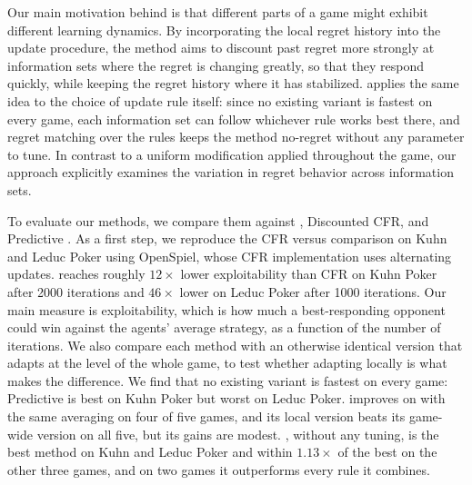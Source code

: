 Our main motivation behind \ours{} is that different parts of a game might exhibit different
learning dynamics. By incorporating the local regret history into the update procedure, the
method aims to discount past regret more strongly at information sets where the regret is
changing greatly, so that they respond quickly, while keeping the regret history where it has
stabilized. \mix{} applies the same idea to the choice of update rule itself: since no existing variant
is fastest on every game, each information set can follow whichever rule works best there,
and regret matching over the rules keeps the method no-regret without any parameter to tune.
In contrast to a uniform modification applied throughout the game, our approach explicitly
examines the variation in regret behavior across information sets.

To evaluate our methods, we compare them against \cfrp{}, Discounted CFR, and Predictive
\cfrp{}. As a first step, we reproduce the CFR versus \cfrp{} comparison on Kuhn and Leduc
Poker using OpenSpiel, whose CFR implementation uses alternating updates. \cfrp{} reaches
roughly $12\times$ lower exploitability than CFR on Kuhn Poker after 2000 iterations and
$46\times$ lower on Leduc Poker after 1000 iterations. Our main measure is exploitability,
which is how much a best-responding opponent could win against the agents' average strategy,
as a function of the number of iterations. We also compare each method with an otherwise
identical version that adapts at the level of the whole game, to test whether adapting locally
is what makes the difference. We find that no existing variant is fastest on every game:
Predictive \cfrp{} is best on Kuhn Poker but worst on Leduc Poker. \ours{} improves on \cfrp{}
with the same averaging on four of five games, and its local version beats its game-wide
version on all five, but its gains are modest. \mix{}, without any tuning, is the best method
on Kuhn and Leduc Poker and within $1.13\times$ of the best on the other three games, and on
two games it outperforms every rule it combines.

